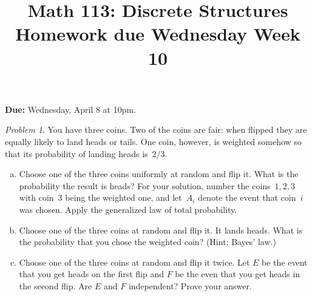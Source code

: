 \documentclass[11pt,twoside]{amsart}
\title{Math 113: Discrete Structures\\ Homework due Wednesday Week 10}
\theoremstyle{plain}
\theoremstyle{remark}
\newtheorem{prob}{Problem}
\theoremstyle{definition}
\theoremstyle{definition}
\begin{document}
\maketitle

\noindent
\textbf{Due:} Wednesday, April 8 at 10pm.
\bigskip

\begin{prob}
  You have three coins.  Two of the coins are fair: when flipped they are
  equally likely to land heads or tails. One coin, however, is weighted somehow
  so that its probability of landing heads is~$2/3$.
  \begin{enumerate}[(a)]
    \item Choose one of the three coins uniformly at random and flip it. What is
      the probability the result is heads?  For your solution, number the
      coins~$1,2,3$ with coin~$3$ being the weighted one, and let~$A_i$ denote
      the event that coin~$i$ was chosen. Apply the generalized law of total
      probability.
    \item Choose one of the three coins at random and flip it.  It lands heads.
      What is the probability that you chose the weighted coin? (Hint: Bayes'
      law.)
     \item Choose one of the three coins at random and flip it twice.  Let $E$ be the event that you get heads on the first flip and $F$ be the even that you get heads in the second flip. Are $E $ and $F$ independent? Prove your answer.
  \end{enumerate}
\end{prob}
\end{document}
